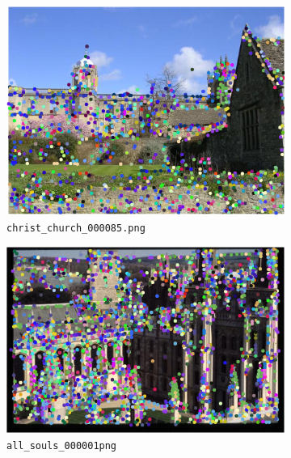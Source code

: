 \documentclass[a4paper,10pt,twoside]{article}
\begin{document}
\begin{figure}
  \begin{subfigure}{0.49\textwidth}
    \centering
    \includegraphics[width=\textwidth,height=.3\textheight,keepaspectratio]{randomimage1}
    \caption{\texttt{christ\_church\_000085.png}}
    \label{sfig:cc85}
  \end{subfigure}
  \begin{subfigure}{0.49\textwidth}
    \centering
    \includegraphics[width=\textwidth,height=.3\textheight,keepaspectratio]{randomimage2}
    \caption{\texttt{all\_souls\_000001png}}
    \label{sfig:as1}
  \end{subfigure}
  \begin{subfigure}{0.49\textwidth}
    \centering

\end{subfigure}
\end{figure}
\end{document}
